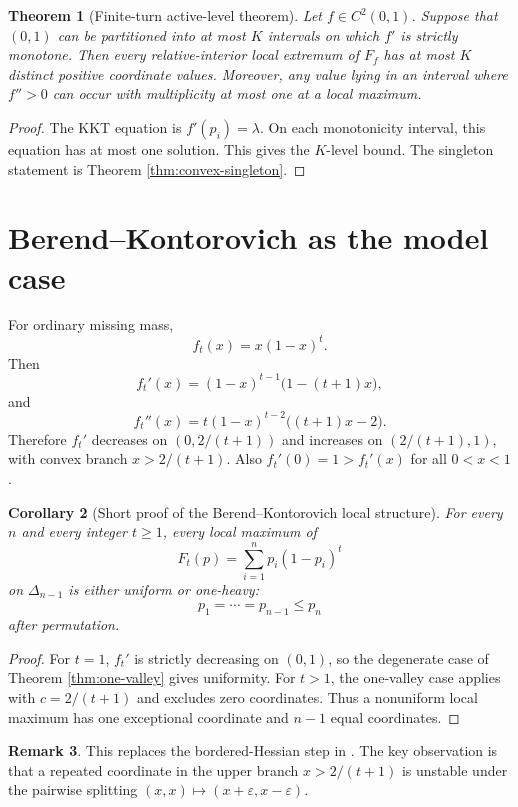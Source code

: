 \documentclass[11pt]{article}
\newtheorem{theorem}{Theorem}[section]
\newtheorem{corollary}[theorem]{Corollary}
\theoremstyle{definition}
\newtheorem{remark}[theorem]{Remark}
\begin{document}
\begin{theorem}[Finite-turn active-level theorem]\label{thm:finite-turn}
Let $f\in C^2(0,1)$. Suppose that $(0,1)$ can be partitioned into at most $K$ intervals on which $f'$ is strictly monotone. Then every relative-interior local extremum of $F_f$ has at most $K$ distinct positive coordinate values. Moreover, any value lying in an interval where $f''>0$ can occur with multiplicity at most one at a local maximum.
\end{theorem}

\begin{proof}
The KKT equation is $f'(p_i)=\lambda$. On each monotonicity interval, this equation has at most one solution. This gives the $K$-level bound. The singleton statement is Theorem \ref{thm:convex-singleton}.
\end{proof}

\section{Berend--Kontorovich as the model case}

For ordinary missing mass,
\[
  f_t(x)=x(1-x)^t.
\]
Then
\[
  f_t'(x)=(1-x)^{t-1}\bigl(1-(t+1)x\bigr),
\]
and
\[
  f_t''(x)=t(1-x)^{t-2}\bigl((t+1)x-2\bigr).
\]
Therefore $f_t'$ decreases on $(0,2/(t+1))$ and increases on $(2/(t+1),1)$, with convex branch $x>2/(t+1)$. Also $f_t'(0)=1>f_t'(x)$ for all $0<x<1$.

\begin{corollary}[Short proof of the Berend--Kontorovich local structure]\label{cor:BK-short}
For every $n$ and every integer $t\ge 1$, every local maximum of
\[
  F_t(p)=\sum_{i=1}^n p_i(1-p_i)^t
\]
on $\Delta_{n-1}$ is either uniform or one-heavy:
\[
  p_1=\cdots=p_{n-1}\le p_n
\]
after permutation.
\end{corollary}

\begin{proof}
For $t=1$, $f_t'$ is strictly decreasing on $(0,1)$, so the degenerate case of Theorem \ref{thm:one-valley} gives uniformity. For $t>1$, the one-valley case applies with $c=2/(t+1)$ and excludes zero coordinates. Thus a nonuniform local maximum has one exceptional coordinate and $n-1$ equal coordinates.
\end{proof}

\begin{remark}
This replaces the bordered-Hessian step in \cite{BK}. The key observation is that a repeated coordinate in the upper branch $x>2/(t+1)$ is unstable under the pairwise splitting $(x,x)\mapsto(x+\varepsilon,x-\varepsilon)$.
\end{remark}
\end{document}
